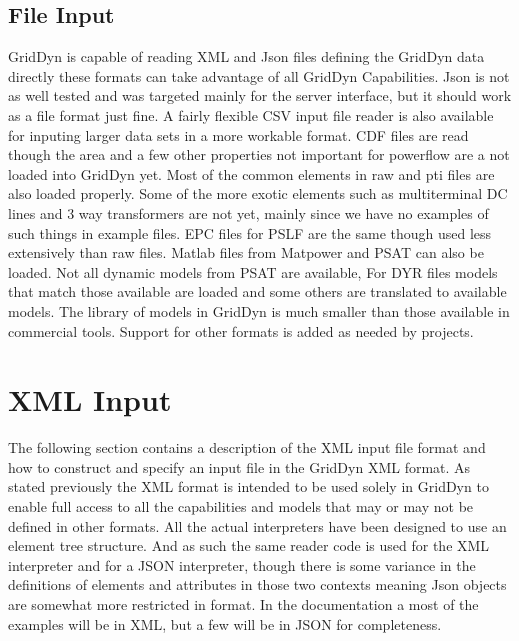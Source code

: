 \documentclass[12pt]{article} %
\begin{document}
\subsection{File Input}
GridDyn is capable of reading XML and Json files defining the GridDyn data directly these formats can take advantage of all GridDyn Capabilities.  Json is not as well tested and was targeted mainly for the server interface, but it should work as a file format just fine.  A fairly flexible CSV input file reader is also available for inputing larger data sets in a more workable format.  CDF files are read though the area and a few other properties not important for powerflow are a not loaded into GridDyn yet.  Most of the common elements in raw and pti files are also loaded properly.  Some of the more exotic elements such as multiterminal DC lines and 3 way transformers are not yet, mainly since we have no examples of such things in example files.  EPC files for PSLF are the same though used less extensively than raw files.  Matlab files from Matpower and PSAT can also be loaded.  Not all dynamic models from PSAT are available,  For DYR files models that match those available are loaded and some others are translated to available models.  The library of models in GridDyn is much smaller than those available in commercial tools.  Support for other formats is added as needed by projects.

\section {XML Input}
The following section contains a description of the XML input file format and how to construct and specify an input file in the GridDyn XML format.   As stated previously the XML format is intended to be used solely in GridDyn to enable full access to all the capabilities and models that may or may not be defined in other formats.  All the actual interpreters have been designed to use an element tree structure.  And as such the same reader code is used for the XML interpreter and for a JSON interpreter, though there is some variance in the definitions of elements and attributes in those two contexts meaning Json objects are somewhat more restricted in format.  In the documentation a most of the examples will be in XML, but a few will be in JSON for completeness.
\end{document}
